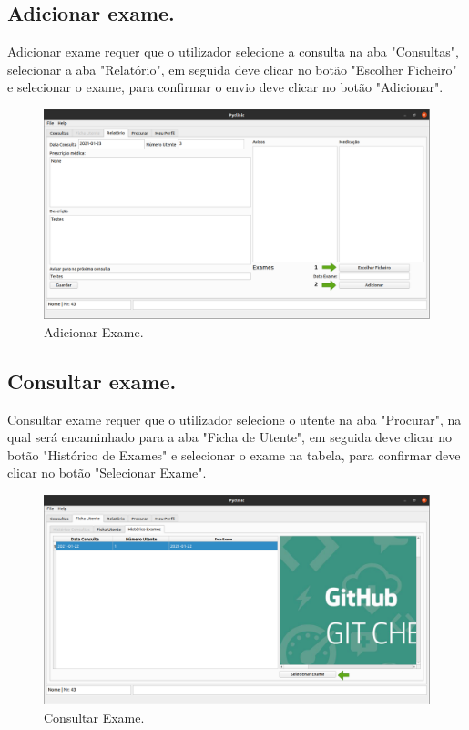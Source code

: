 \documentclass[11pt,a4paper,twoside]{article}
\begin{document}
\subsection{Adicionar exame.}
Adicionar exame requer que o utilizador selecione a consulta na aba "Consultas", selecionar a aba "Relatório", em seguida deve clicar no botão "Escolher Ficheiro" e selecionar o exame, para confirmar o envio deve clicar no botão "Adicionar".

\begin{figure}[H]
	\centering
	\includegraphics[width=0.9\linewidth]{image/medico/exames.png}
	\caption{Adicionar Exame.}
	\label{fig:adicionarexame}
\end{figure}

\subsection{Consultar exame.}
Consultar exame requer que o utilizador selecione o utente na aba "Procurar", na qual será encaminhado para a aba "Ficha de Utente", em seguida deve clicar no botão "Histórico de Exames" e selecionar o exame na tabela, para confirmar deve clicar no botão "Selecionar Exame".

\begin{figure}[H]
	\centering
	\includegraphics[width=0.9\linewidth]{image/medico/ConsultarExame.png}
	\caption{Consultar Exame.}
	\label{fig:consultarexame}
\end{figure}
\end{document}
